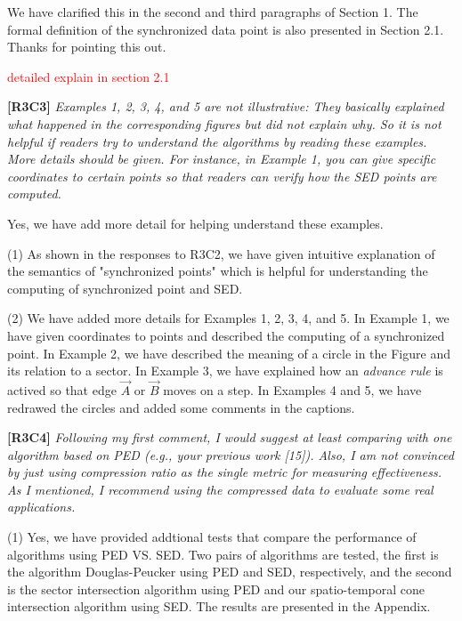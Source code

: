 \documentclass{letter}
\begin{document}
We have clarified this in the second and third paragraphs of Section 1. The formal definition of the synchronized data point is also presented in Section 2.1.
Thanks for pointing this out.


\textcolor{red}{detailed explain in section 2.1}

\textbf{[R3C3]} \emph{Examples 1, 2, 3, 4, and 5 are not illustrative: They basically explained what happened in the corresponding figures but did not explain why. So it is not helpful if readers try to understand the algorithms by reading these examples. More details should be given. For instance, in Example 1, you can give specific coordinates to certain points so that readers can verify how the SED points are computed.}

Yes, we have add more detail for helping understand these examples.

(1) As shown in the responses to R3C2, we have given intuitive explanation of the semantics of "synchronized points" which is helpful for understanding the computing of synchronized point and SED.

(2) We have added more details for Examples 1, 2, 3, 4, and 5. In Example 1, we have given coordinates to points and described the computing of a synchronized point. In Example 2, we have described the meaning of a circle in the Figure and its relation to a sector. In Example 3, we have explained how an \emph{advance rule} is actived so that edge $\overrightarrow{A}$ or $\overrightarrow{B}$ moves on a step. In Examples 4 and 5, we have redrawed the circles and added some comments in the captions.

\textbf{[R3C4]} \emph{Following my first comment, I would suggest at least comparing with one algorithm based on PED (e.g., your previous work [15]). Also, I am not convinced by just using compression ratio as the single metric for measuring effectiveness. As I mentioned, I recommend using the compressed data to evaluate some real applications.}

(1) Yes, we have provided addtional tests that compare the performance of algorithms using PED VS. SED. Two pairs of algorithms are tested, the first is the algorithm Douglas-Peucker using PED and SED, respectively, and the second is the sector intersection algorithm using PED and our spatio-temporal cone intersection algorithm using SED. %
The results are presented in the Appendix.
\end{document}
